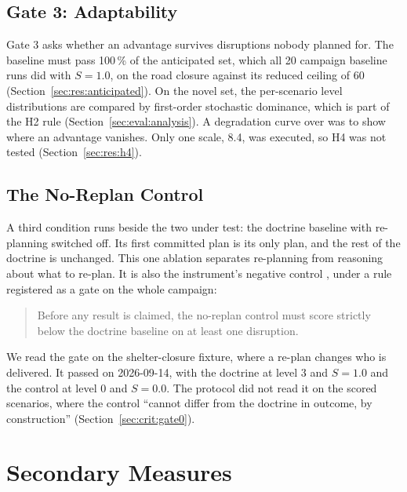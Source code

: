 \subsection{Gate 3: Adaptability}
\label{sec:eval:gate3}

Gate 3 asks whether an advantage survives disruptions nobody planned for. The
baseline must pass 100\,\% of the anticipated set, which all 20 campaign
baseline runs did with $S = 1.0$, on the road closure against its reduced
ceiling of 60 (Section~\ref{sec:res:anticipated}). On the novel set, the per-scenario level
distributions are compared by first-order stochastic dominance, which is part
of the H2 rule (Section~\ref{sec:eval:analysis}). A degradation curve over  was to show where an
advantage vanishes. Only one scale, 8.4, was executed, so H4 was not tested
(Section~\ref{sec:res:h4}).

\subsection{The No-Replan Control}
\label{sec:eval:noreplan}

A third condition runs beside the two under test: the doctrine baseline with
re-planning switched off. Its first committed plan is its only plan, and the
rest of the doctrine is unchanged. This one ablation separates re-planning from
reasoning about what to re-plan. It is also the instrument's negative control
\parencite{lipsitch2010}, under a rule registered as a gate on the whole
campaign:

\begin{quote}
Before any result is claimed, the no-replan control must score strictly below
the doctrine baseline on at least one disruption.
\end{quote}

We read the gate on the
shelter-closure fixture, where a re-plan changes who is delivered. It passed on
2026-09-14, with the doctrine at level 3 and $S = 1.0$ and the control at
level 0 and $S = 0.0$. The protocol did not read it on the scored scenarios,
where the control ``cannot differ from the doctrine in outcome, by
construction'' (Section~\ref{sec:crit:gate0}).

\section{Secondary Measures}
\label{sec:eval:secondary}

